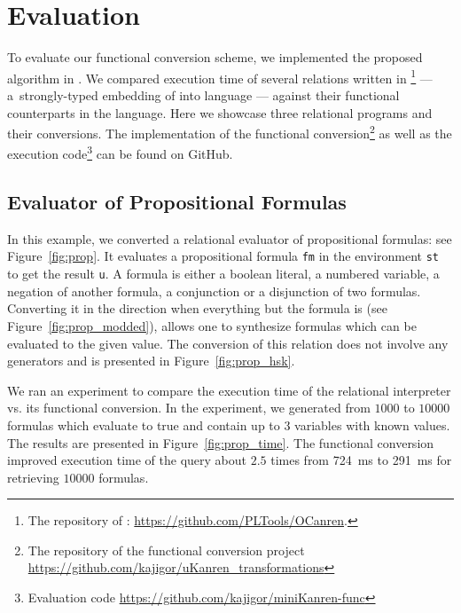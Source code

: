 \section{Evaluation}
\label{sec:evaluation}

To evaluate our functional conversion scheme, we implemented the proposed algorithm in \haskell.
We compared execution time of several relations written in \ocanren\footnote{The repository of \ocanren: \url{https://github.com/PLTools/OCanren}.} --- a~strongly-typed embedding of \mk into \ocaml language --- against their functional counterparts in the \ocaml language.
Here we showcase three relational programs and their conversions.
The implementation of the functional conversion\footnote{The repository of the functional conversion project \url{https://github.com/kajigor/uKanren_transformations}} as well as the execution code\footnote{Evaluation code \url{https://github.com/kajigor/miniKanren-func}} can be found on GitHub.



\subsection{Evaluator of Propositional Formulas}

In this example, we converted a relational evaluator of propositional formulas: see Figure~\ref{fig:prop}.
It evaluates a propositional formula \lstinline{fm} in the environment \lstinline{st} to get the result \lstinline{u}.
A formula is either a boolean literal, a numbered variable, a negation of another formula, a conjunction or a disjunction of two formulas.
Converting it in the direction when everything but the formula is \inm (see Figure~\ref{fig:prop_modded}), allows one to synthesize formulas which can be evaluated to the given value.
The conversion of this relation does not involve any generators and is presented in Figure~\ref{fig:prop_hsk}.

We ran an experiment to compare the execution time of the relational interpreter vs. its functional conversion.
In the experiment, we generated from $1000$ to $10000$ formulas which evaluate to true and contain up to $3$ variables with known values.
The results are presented in Figure~\ref{fig:prop_time}.
The functional conversion improved execution time of the query about $2.5$ times from \SI{724}{ms} to \SI{291}{ms} for retrieving $10000$ formulas.






